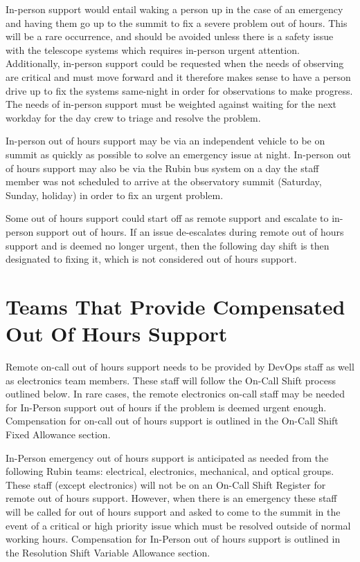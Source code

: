 In-person support would entail waking a person up in the case of an emergency and having them go up to the summit to fix a severe problem out of hours. This will be a rare occurrence, and should be avoided unless there is a safety issue with the telescope systems which requires in-person urgent attention.   Additionally, in-person support could be requested when the needs of observing are critical and must move forward and it therefore makes sense to have a person drive up to fix the systems same-night in order for observations to make progress.  The needs of in-person support must be weighted against waiting for the next workday for the day crew to triage and resolve the problem.

In-person out of hours support may be via an independent vehicle to be on summit as quickly as possible to solve an emergency issue at night.  In-person out of hours support may also be via the Rubin bus system on a day the staff member was not scheduled to arrive at the observatory summit (Saturday, Sunday, holiday) in order to fix an urgent problem.

Some out of hours support could start off as remote support and escalate to in-person support out of hours.  If an issue de-escalates during remote out of hours support and is deemed no longer urgent, then the following day shift is then designated to fixing it, which is not considered out of hours support.

\section{Teams That Provide Compensated Out Of Hours Support}

Remote on-call out of hours support needs to be provided by DevOps staff as well as electronics team members.  These staff will follow the On-Call Shift process outlined below.  In rare cases, the remote electronics on-call staff may be needed for In-Person support out of hours if the problem is deemed urgent enough.  Compensation for on-call out of hours support is outlined in the On-Call Shift Fixed Allowance section.

In-Person emergency out of hours support is anticipated as needed from the following Rubin teams:  electrical, electronics, mechanical, and optical groups.  These staff (except electronics) will not be on an On-Call Shift Register for remote out of hours support.  However, when there is an emergency these staff will be called for out of hours support and asked to come to the summit in the event of a critical or high priority issue which must be resolved outside of normal working hours.  Compensation for In-Person out of hours support is outlined in the Resolution Shift Variable Allowance section.

